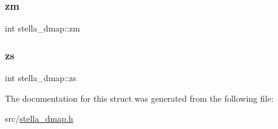 \mbox{\label{structstella__dmap_af16139e8ef8d7724bbeb8af004176c68}} 
\subsubsection{\texorpdfstring{zm}{zm}}
{\footnotesize\ttfamily int stella\+\_\+dmap\+::zm}

\mbox{\label{structstella__dmap_a06bde1f9d13046c7f907a2ccdd38345e}} 
\subsubsection{\texorpdfstring{zs}{zs}}
{\footnotesize\ttfamily int stella\+\_\+dmap\+::zs}



The documentation for this struct was generated from the following file\+:\begin{DoxyCompactItemize}
\item 
src/\mbox{\hyperlink{stella__dmap_8h}{stella\+\_\+dmap.\+h}}\end{DoxyCompactItemize}
